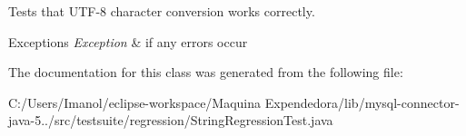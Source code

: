 Tests that U\+T\+F-\/8 character conversion works correctly.


\begin{DoxyExceptions}{Exceptions}
{\em Exception} & if any errors occur \\
\hline
\end{DoxyExceptions}


The documentation for this class was generated from the following file\+:\begin{DoxyCompactItemize}
\item 
C\+:/\+Users/\+Imanol/eclipse-\/workspace/\+Maquina Expendedora/lib/mysql-\/connector-\/java-\/5../src/testsuite/regression/String\+Regression\+Test.\+java\end{DoxyCompactItemize}
